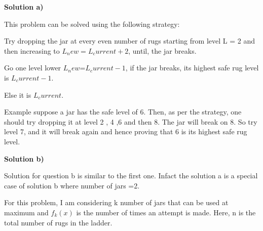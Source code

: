\documentclass[letterpaper,portrait,12pt]{article}
\begin{document}
\begin{flushleft}
\textbf{Solution a)}
\end{flushleft}


\begin{flushleft}
This problem can be solved using the following strategy:
\end{flushleft}


\begin{flushleft}
Try dropping the jar at every even number of rugs starting from level L = 2 and then increasing to $L_new=L_current+2$, until, the jar breaks.
\end{flushleft}


\begin{flushleft}
Go one level lower $L_new$=$L_current-1$, if the jar breaks, its highest safe rug level is $L_current-1.$
\end{flushleft}


\begin{flushleft}
		Else it is $L_current$.
\end{flushleft}


\begin{flushleft}

\end{flushleft}


\begin{flushleft}
Example suppose a jar has the safe level of 6. Then, as per the strategy, one should try dropping it at level 2 , 4 ,6 and then 8. The jar will break on 8. So try level 7, and it will break again and hence proving that 6 is its highest safe rug level.
\end{flushleft}


\begin{flushleft}

\end{flushleft}


\begin{flushleft}
\textbf{Solution b)}
\end{flushleft}


\begin{flushleft}
	Solution for question b is similar to the first one. Infact the solution a is a special case of solution b where number of jars =2.
\end{flushleft}


\begin{flushleft}
For this problem, I am considering k number of jars that can be used at maximum and $f_k(x)$ is the number of times an attempt is made. Here, n is the total number of rugs in the ladder.
\end{flushleft}
\end{document}
